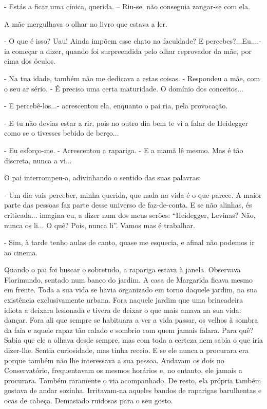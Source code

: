 - Estás a ficar uma cínica, querida. -- Riu-se, não conseguia zangar-se
com ela.

A mãe mergulhava o olhar no livro que estava a ler.

- O que é isso? Uau! Ainda impõem esse chato na faculdade? E
percebes?...Eu....- ia começar a dizer, quando foi surpreendida pelo
olhar reprovador da mãe, por cima dos óculos.

- Na tua idade, também não me dedicava a estas coisas. - Respondeu a
mãe, com o seu ar sério. - É preciso uma certa maturidade. O domínio dos
conceitos...

- E percebê-los...- acrescentou ela, enquanto o pai ria, pela
provocação.

- E tu não devias estar a rir, pois no outro dia bem te vi a falar de
Heidegger como se o tivesses bebido de berço...

- Eu esforço-me. - Acrescentou a rapariga. - E a mamã lê mesmo. Mas é
tão discreta, nunca a vi...

O pai interrompeu-a, adivinhando o sentido das suas palavras:

- Um dia vais perceber, minha querida, que nada na vida é o que parece.
A maior parte das pessoas faz parte desse universo de faz-de-conta. E se
não alinhas, és criticada... imagina eu, a dizer num dos meus serões:
``Heidegger, Levinas? Não, nunca os li... O quê? Pois, nunca li''. Vamos
mas é trabalhar.

- Sim, à tarde tenho aulas de canto, quase me esquecia, e afinal não
podemos ir ao cinema.

Quando o pai foi buscar o sobretudo, a rapariga estava à janela.
Observava Florimundo, sentado num banco do jardim. A casa de Margarida
ficava mesmo em frente. Toda a sua vida se havia organizado em torno
daquele jardim, na sua existência exclusivamente urbana. Fora naquele
jardim que uma brincadeira idiota a deixara lesionada e tivera de deixar
o que mais amava na sua vida: dançar. Fora ali que sempre se habituara a
ver a vida passar, os velhos à sombra da faia e aquele rapaz tão calado
e sombrio com quem jamais falara. Para quê? Sabia que ele a olhava desde
sempre, mas com toda a certeza nem sabia o que iria dizer-lhe. Sentia
curiosidade, mas tinha receio. E se ele nunca a procurara era porque
também não lhe interessava a sua pessoa. Andavam os dois no
Conservatório, frequentavam os mesmos horários e, no entanto, ele jamais
a procurara. Também raramente o via acompanhado. De resto, ela própria
também gostava de andar sozinha. Irritavam-na aqueles bandos de
raparigas barulhentas e ocas de cabeça. Demasiado ruidosas para o seu
gosto.

